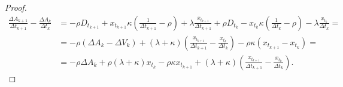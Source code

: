 \documentclass[a4paper]{article}
\theoremstyle{definition}
\begin{document}
\begin{proof}
\begin{align*}
    \frac{\Delta A_{k+1}}{\Delta t_{k+1}} - \frac{\Delta A_{k}}{\Delta t_{k}} 
    &=- \rho D_{t_{k+1}} + x_{t_{k+1}} \kappa \left(\frac{1}{\Delta t_{k+1}} - \rho \right) + \lambda \frac{x_{t_{k+1}}}{\Delta t_{k+1}}
     + \rho D_{t_{k}}   - x_{t_{k}}   \kappa \left(\frac{1}{\Delta t_{k}} - \rho \right)   - \lambda \frac{x_{t_k}}    {\Delta t_{k}} = \\
    &= -\rho (\Delta A_k - \Delta V_k) + (\lambda + \kappa) \left(\frac{x_{t_{k+1}}}{\Delta t_{k+1}} - \frac{x_{t_k}}{\Delta t_{k}}\right) - \rho \kappa (x_{t_{k+1}} - x_{t_{k}})= \\
    &= -\rho \Delta A_k + \rho (\lambda + \kappa) x_{t_k} - \rho \kappa x_{t_{k+1}} + (\lambda + \kappa) \left(\frac{x_{t_{k+1}}}{\Delta t_{k+1}} - \frac{x_{t_k}}{\Delta t_{k}}\right).
\end{align*} 

\end{proof}
\end{document}
